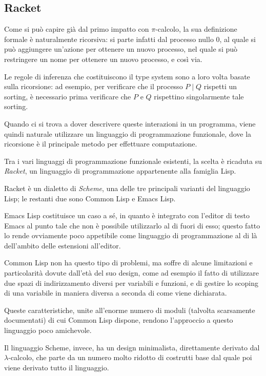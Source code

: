 \subsection{Racket}

Come si pu\`o capire gi\`a dal primo impatto con $\pi$-calcolo, la sua
definizione formale \`e naturalmente ricorsiva: si parte infatti dal
processo nullo $0$, al quale si pu\`o aggiungere un'azione per ottenere
un nuovo processo, nel quale si pu\`o restringere un nome per ottenere un
nuovo processo, e cos\`i via.

Le regole di inferenza che costituiscono il type system sono a loro volta
basate sulla ricorsione: ad esempio, per verificare che il processo
$P \; | \; Q$ rispetti un sorting, \`e necessario prima verificare che
$P$ e $Q$ rispettino singolarmente tale sorting.

Quando ci si trova a dover descrivere queste interazioni in un programma,
viene quindi naturale utilizzare un linguaggio di programmazione
funzionale, dove la ricorsione \`e il principale metodo per effettuare
computazione.

Tra i vari linguaggi di programmazione funzionale esistenti, la scelta
\`e ricaduta su \emph{Racket}, un linguaggio di programmazione
appartenente alla famiglia Lisp.

Racket \`e un dialetto di \emph{Scheme}, una delle tre principali
varianti del linguaggio Lisp; le restanti due sono Common Lisp e Emacs
Lisp.

Emacs Lisp costituisce un caso a s\'e, in quanto \`e integrato con
l'editor di testo Emacs al punto tale che non \`e possibile
utilizzarlo al di fuori di esso; questo fatto lo rende ovviamente poco
appetibile come linguaggio di programmazione al di l\`a dell'ambito
delle estensioni all'editor.

Common Lisp non ha questo tipo di problemi, ma soffre di alcune
limitazioni e particolarit\`a dovute dall'et\`a del suo design, come
ad esempio il fatto di utilizzare due spazi di indirizzamento diversi
per variabili e funzioni, e di gestire lo scoping di una variabile in
maniera diversa a seconda di come viene dichiarata.

Queste caratteristiche, unite all'enorme numero di moduli (talvolta
scarsamente documentati) di cui Common Lisp dispone, rendono l'approccio
a questo linguaggio poco amichevole.

Il linguaggio Scheme, invece, ha un design minimalista, direttamente
derivato dal $\lambda$-calcolo, che parte da un numero molto ridotto di
costrutti base dal quale poi viene derivato tutto il linguaggio.

